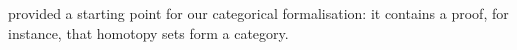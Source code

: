 \cite{iversenUnivalentCategoriesFormalization2018} provided a starting point for
our categorical formalisation: it contains a proof, for instance, that homotopy
sets form a category.



 